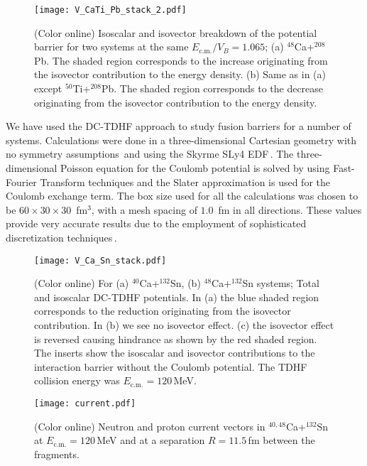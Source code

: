 \documentclass[aps,prl,twocolumn,superscriptaddress,floatfix,10pt]{revtex4-1}
\begin{document}
\begin{figure}[!htb]
\texttt{[image: V\_CaTi\_Pb\_stack\_2.pdf]}
\caption{(Color online) Isoscalar and isovector breakdown of the potential barrier for two
    systems at the same $E_\mathrm{c.m.}/V_B=1.065$;
    (a) $^{48}$Ca+$^{208}$Pb. The shaded region corresponds to the increase originating
    from the isovector contribution to
    the energy density.
    (b) Same as in (a) except $^{50}$Ti+$^{208}$Pb.
    The shaded region corresponds to the decrease originating from the isovector contribution to
    the energy density.}
 \label{fig:CaTi_Pb}
\end{figure}

We have used the DC-TDHF approach to study fusion barriers for a number of systems.
Calculations were done in a three-dimensional
Cartesian geometry with no symmetry assumptions\,\cite{umar2006c} and using the
Skyrme SLy4 EDF\,\cite{chabanat1998a}.
The three-dimensional Poisson equation for the Coulomb potential
is solved by using Fast-Fourier Transform techniques
and the Slater approximation is used for the Coulomb exchange term.
The box size used for all the calculations
was chosen to be $60\times 30\times 30$~fm$^3$, with a mesh spacing of
$1.0$~fm in all directions. These values provide very accurate
results due to the employment of sophisticated discretization
techniques\,\cite{umar1991a}.
\begin{figure}[!htb]
\texttt{[image: V\_Ca\_Sn\_stack.pdf]}
\caption{(Color online) For     (a) $^{40}$Ca+$^{132}$Sn,
	                            (b) $^{48}$Ca+$^{132}$Sn
	                            systems;
	Total and isoscalar DC-TDHF potentials. In (a) the blue shaded region
       corresponds to the reduction originating from the isovector contribution.
       In (b) we see no isovector effect. (c) the isovector effect is reversed
       causing hindrance as shown by the red shaded region.
The inserts show the isoscalar and isovector contributions to the interaction barrier without the Coulomb potential.
The TDHF collision energy was $E_\mathrm{c.m.}=120$\,MeV.}
\label{fig:CaSn_1}
\end{figure}
\begin{figure}[!htb]
\centering
\texttt{[image: current.pdf]}
\caption{(Color online) Neutron and proton current vectors in $^{40,48}$Ca+$^{132}$Sn at $E_\mathrm{c.m.}=120$\,MeV and at
	a separation  $R=11.5$\,fm between the fragments.}
\label{fig:current}
\end{figure}
\end{document}
